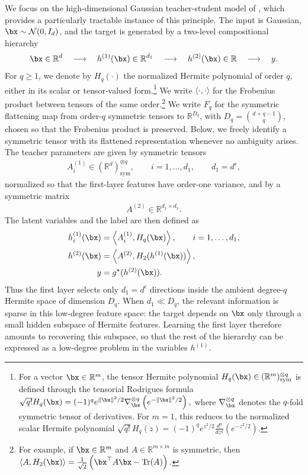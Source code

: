 We focus on the high-dimensional Gaussian teacher-student model of \cite{tabanelli2026deep}, which provides a particularly tractable instance of this principle. The input is Gaussian, $\bx\sim\mathcal N(0,I_d)$, and the target is generated by a two-level compositional hierarchy
\begin{align}
    \bx \in \mathbb R^d
    \quad \longrightarrow \quad
    h^{(1)}(\bx) \in \mathbb R^{d_1}
    \quad \longrightarrow \quad
    h^{(2)}(\bx) \in \mathbb R
    \quad \longrightarrow \quad
    y .
\end{align}
For $q\geq 1$, we denote by $H_q(\cdot)$ the normalized Hermite polynomial of order $q$, either in its scalar or tensor-valued form.\footnote{
For a vector $\bx\in\mathbb R^m$, the tensor Hermite polynomial $H_q(\bx)\in(\mathbb R^m)_{\mathrm{sym}}^{\otimes q}$ is defined through the tensorial Rodrigues formula
$
\sqrt{q!} H_q(\bx)
=
(-1)^q e^{\|\bx\|^2/2}
\nabla_{\bx}^{\otimes q}
\left(e^{-\|\bx\|^2/2}\right),
$
where $\nabla_{\bx}^{\otimes q}$ denotes the $q$-fold symmetric tensor of derivatives. 
For $m=1$, this reduces to the normalized scalar Hermite polynomial
$
\sqrt{q!} H_q(z)
=
(-1)^q e^{z^2/2}
\frac{d^q}{dz^q}
\left(e^{-z^2/2}\right).
$
}
We write $\langle\cdot,\cdot\rangle$ for the Frobenius product between tensors of the same order.\footnote{
For example, if $\bx\in\mathbb R^m$ and $A\in\mathbb R^{m\times m}$ is symmetric, then
$
\left\langle A,H_2(\bx)\right\rangle
=
\frac{1}{\sqrt{2}}
\left(
    \bx^\top A\bx-\mathrm{Tr}(A)
\right).
$
}
We write $F_q$ for the symmetric flattening map from order-$q$ symmetric tensors to $\mathbb R^{D_q}$, with $D_q=\binom{d+q-1}{q}$, chosen so that the Frobenius product is preserved. 
Below, we freely identify a symmetric tensor with its flattened representation whenever no ambiguity arises. The teacher parameters are given by symmetric tensors
\begin{align}
    A_i^{(1)}
    \in
    (\mathbb R^d)_{\mathrm{sym}}^{\otimes q},
    \qquad
    i=1,\ldots,d_1,
    \qquad
    d_1=d^\epsilon,
\end{align}
normalized so that the first-layer features have order-one variance, and by a symmetric matrix
\begin{align}
    A^{(2)}
    \in
    \mathbb R^{d_1\times d_1}.
\end{align}
The latent variables and the label are then defined as
\begin{align}
    h^{(1)}_i(\bx)
    &=
    \left\langle
        A_i^{(1)}, H_q(\bx)
    \right\rangle,
    \qquad i=1,\ldots,d_1, \\
    h^{(2)}(\bx)
    &=
    \left\langle
        A^{(2)}, H_2(h^{(1)}(\bx))
    \right\rangle, \\
    y
    &=
    g^\star(h^{(2)}(\bx)).
\end{align}
Thus the first layer selects only $d_1=d^\epsilon$ directions inside the ambient degree-$q$ Hermite space of dimension $D_q$. When $d_1\ll D_q$, the relevant information is sparse in this low-degree feature space: the target depends on $\bx$ only through a small hidden subspace of Hermite features. Learning the first layer therefore amounts to recovering this subspace, so that the rest of the hierarchy can be expressed as a low-degree problem in the variables $h^{(1)}$.

